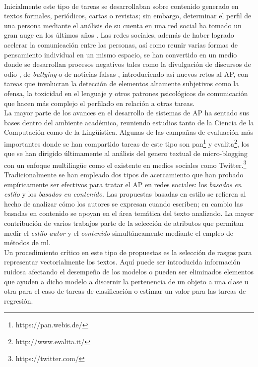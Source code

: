 \\
Inicialmente este tipo de tareas se desarrollaban sobre contenido generado en textos formales, periódicos, cartas o revistas; sin embargo, determinar el perfil de una persona mediante el análisis de su cuenta en una red social ha tomado un gran auge en los últimos años \citep{rangel:2018,rangel:2019,f6032ffbacb14369b7a45d1ba9bd0b8c}.
 Las redes sociales, además de haber logrado acelerar la comunicación entre las personas, así como reunir varias formas de pensamiento individual en un mismo espacio, se han convertido en un medio donde se desarrollan procesos negativos tales como la divulgación de discursos de odio \citep{rangel2021profiling}, de \textit{bullying} o de noticias falsas \citep{rangel:2020}, introduciendo así nuevos retos al AP, con tareas que involucran la detección de elementos altamente subjetivos como la ofensa, la toxicidad en el lenguaje y otros patrones psicológicos de comunicación que hacen más complejo el perfilado en relación a otras tareas.  
\\
 La mayor parte de los avances en el desarrollo de sistemas de AP ha sentado sus bases dentro del ambiente académico, reuniendo estudios tanto de la Ciencia de la Computación como de la Lingüística. Algunas de las campañas de evaluación más importantes donde se han compartido tareas de este tipo son \ac{pan}\footnote{https://pan.webis.de/} y \ac{evalita}\footnote{http://www.evalita.it/}, los que se han dirigido últimamente al análisis del genero textual de micro-blogging  con un enfoque multilingüe como el existente en medios sociales como Twitter.\footnote{https://twitter.com/}
\\
Tradicionalmente se han empleado dos tipos de acercamiento que han probado empíricamente ser efectivos para tratar el AP en redes sociales: los \textit{basados en estilo}  y los \textit{basados en contenido}. Las propuestas basadas en estilo se refieren al hecho de analizar cómo los autores se expresan cuando escriben; en cambio las basadas en contenido se apoyan en el área temática del texto analizado. La mayor contribución de varios trabajos parte de la selección de atributos que permitan medir el \textit{estilo autor} y el \textit{contenido} simultáneamente mediante el empleo de métodos de \ac{ml}.
\\
Un procedimiento crítico en este tipo de propuestas es la selección de rasgos para representar vectorialmente los textos. Aquí puede ser introducida información ruidosa afectando el desempeño de los modelos o pueden ser eliminados elementos que ayuden a dicho modelo a discernir la pertenencia de un objeto a una clase u otra para el caso de tareas de clasificación o estimar un valor para las tareas de regresión.
